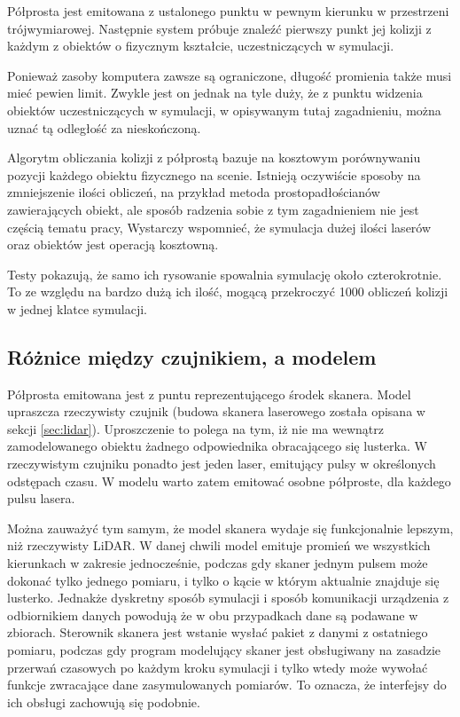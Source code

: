 		Półprosta jest emitowana z ustalonego punktu w pewnym kierunku w przestrzeni trójwymiarowej.
		Następnie system próbuje znaleźć pierwszy punkt jej kolizji z każdym z obiektów o fizycznym kształcie, uczestniczących w symulacji.
		
		Ponieważ zasoby komputera zawsze są ograniczone, długość promienia także musi mieć pewien limit. 
		Zwykle jest on jednak na tyle duży, że z punktu widzenia obiektów uczestniczących w symulacji, w opisywanym tutaj zagadnieniu, 
		można uznać tą odległość za nieskończoną.

		Algorytm obliczania kolizji z półprostą bazuje na kosztowym porównywaniu pozycji każdego obiektu fizycznego na scenie.
		Istnieją oczywiście sposoby na zmniejszenie ilości obliczeń, na przykład metoda prostopadłościanów zawierających obiekt, ale sposób radzenia sobie z tym zagadnieniem nie jest
		częścią tematu pracy,
		Wystarczy wspomnieć, że symulacja dużej ilości laserów oraz obiektów jest operacją kosztowną.
		
		Testy pokazują, że samo ich rysowanie spowalnia symulację około czterokrotnie.
		To ze względu na bardzo dużą ich ilość, mogącą przekroczyć 1000 obliczeń kolizji w jednej klatce symulacji.

	\subsection{Różnice między czujnikiem, a modelem}
		Półprosta emitowana jest z puntu reprezentującego środek skanera.
		Model upraszcza rzeczywisty czujnik (budowa skanera laserowego została opisana w sekcji \ref{sec:lidar}).
		Uproszczenie to polega na tym, iż nie ma wewnątrz zamodelowanego obiektu żadnego odpowiednika obracającego się lusterka.
		W rzeczywistym czujniku ponadto jest jeden laser, emitujący pulsy w określonych odstępach czasu.
		W modelu warto zatem emitować osobne półproste, dla każdego pulsu lasera.

		Można zauważyć tym samym, że model skanera wydaje się funkcjonalnie lepszym, niż rzeczywisty LiDAR.
		W danej chwili model emituje promień we wszystkich kierunkach w zakresie jednocześnie, podczas gdy skaner jednym pulsem może dokonać tylko jednego pomiaru,
		i tylko o kącie w którym aktualnie znajduje się lusterko.
		Jednakże dyskretny sposób symulacji i sposób komunikacji urządzenia z odbiornikiem danych powodują że w obu przypadkach dane są podawane w zbiorach.
		Sterownik skanera jest wstanie wysłać pakiet z danymi z ostatniego pomiaru, podczas gdy program modelujący skaner jest obsługiwany na zasadzie przerwań czasowych 
		po każdym kroku symulacji i tylko wtedy może wywołać funkcje zwracające dane zasymulowanych pomiarów.
		To oznacza, że interfejsy do ich obsługi zachowują się podobnie.

